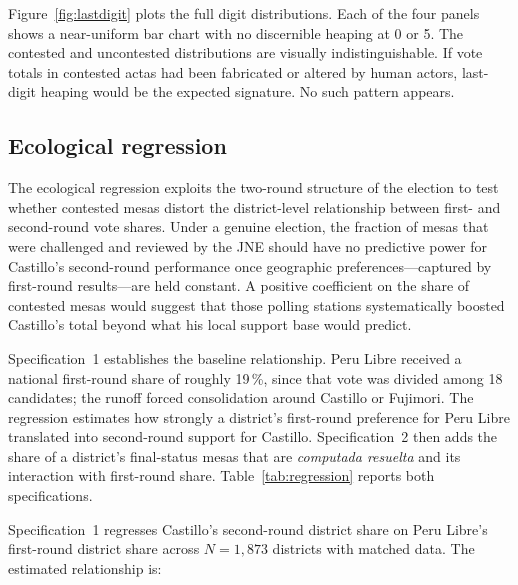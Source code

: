 \documentclass[12pt]{article}
\begin{document}
Figure~\ref{fig:lastdigit} plots the full digit distributions. Each of the
four panels shows a near-uniform bar chart with no discernible heaping
at 0 or 5. The contested and uncontested distributions are visually
indistinguishable. If vote totals in contested actas had been fabricated
or altered by human actors, last-digit heaping would be the expected
signature. No such pattern appears.

\subsection{Ecological regression}

The ecological regression exploits the two-round structure of the election
to test whether contested mesas distort the district-level relationship
between first- and second-round vote shares. Under a genuine election, the
fraction of mesas that were challenged and reviewed by the JNE should have
no predictive power for Castillo's second-round performance once geographic
preferences---captured by first-round results---are held constant. A positive
coefficient on the share of contested mesas would suggest that those polling
stations systematically boosted Castillo's total beyond what his local support
base would predict.

Specification~1 establishes the baseline relationship. Peru Libre received a
national first-round share of roughly 19\,\%, since that vote was divided among
18 candidates; the runoff forced consolidation around Castillo or Fujimori.
The regression estimates how strongly a district's first-round preference for
Peru Libre translated into second-round support for Castillo.
Specification~2 then adds the share of a district's final-status mesas that
are \emph{computada resuelta} and its interaction with first-round share.
Table~\ref{tab:regression} reports both specifications.

Specification~1 regresses Castillo's second-round district share on Peru
Libre's first-round district share across $N = 1{,}873$ districts with
matched data. The estimated relationship is:
\end{document}
